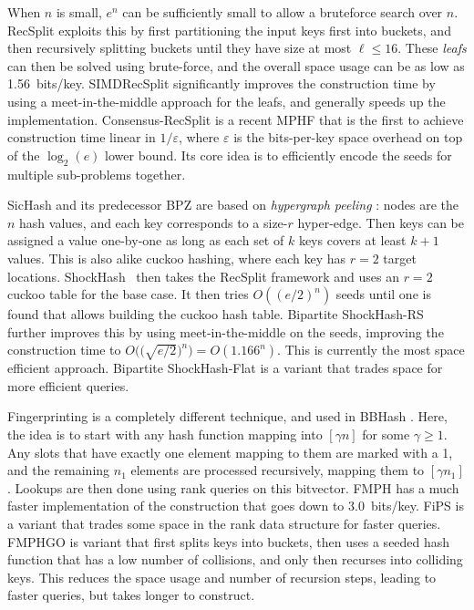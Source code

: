 \documentclass[a4paper,UKenglish,cleveref,thm-restate]{lipics-v2021}
\begin{document}
When \(n\) is small, \(e^n\) can be sufficiently small to allow a bruteforce search
over \(n\). RecSplit exploits this by first partitioning the input
keys first into buckets, and then recursively splitting buckets until they have
size at most \(\ell \leq 16\). These \emph{leafs} can then be solved using brute-force, and the
overall space usage can be as low as 1.56~bits/key. SIMDRecSplit significantly
improves the construction time by using a meet-in-the-middle approach for the
leafs, and generally speeds up the implementation.
Consensus-RecSplit \cite{consensus} is a recent MPHF that is the first to
achieve construction time linear in \(1/\varepsilon\), where \(\varepsilon\) is the
bits-per-key space overhead on top of the \(\log_2(e)\) lower bound. Its core idea
is to efficiently encode the seeds for multiple sub-problems together.

SicHash \cite{sichash} and its predecessor BPZ \cite{bpz} are based on
\emph{hypergraph peeling} \cite{mphf-peeling,hypergraph-peeling-bounds}: nodes are the \(n\) hash values, and each key
corresponds to a size-\(r\) hyper-edge. Then keys can be assigned a value
one-by-one as long as each set of \(k\) keys covers at least \(k+1\) values. This
is also alike cuckoo hashing, where each key has \(r=2\) target locations.
ShockHash~\cite{shockhash} then takes the RecSplit framework and uses an \(r=2\)
cuckoo table for the base case. It then tries \(O((e/2)^n)\) seeds until one is
found that allows building the cuckoo hash table.
Bipartite ShockHash-RS \cite{bipartite-shockhash}
further improves this by using meet-in-the-middle on the seeds, improving the
construction time to \(O\big(\big(\sqrt{e/2}\big)^n\big) = O(1.166^n)\). This is currently the
most space efficient approach. Bipartite ShockHash-Flat is a variant that trades
space for more efficient queries.

Fingerprinting \cite{chapman_2011,muller_2014} is a completely different
technique, and used in BBHash \cite{bbhash}. Here, the
idea is to start with any hash function mapping into \([\gamma n]\) for some
\(\gamma \geq 1\). Any slots that have exactly one element mapping to them are
marked with a 1, and the remaining \(n_1\) elements are processed recursively,
mapping them to \([\gamma n_1]\). Lookups are then done using rank queries on this
bitvector. FMPH \cite{fmph} has a much faster implementation of the construction that goes
down to 3.0~bits/key. FiPS \cite{phf-thesis} is a variant that trades some
space in the rank data structure for faster queries. FMPHGO \cite{fmph} is
variant that first splits keys into buckets, then uses a seeded hash function
that has a low number of collisions, and only then recurses into colliding keys.
This reduces the space usage and number of recursion steps, leading to faster
queries, but takes longer to construct.
\end{document}
